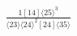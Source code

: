 \documentclass[varwidth, border=5pt]{standalone}
\begin{document}
\begin{my}
$\begin{gathered}
\scriptscriptstyle\frac{1[14]⟨25⟩^3}{⟨23⟩⟨24⟩^2[24]⟨35⟩}
\end{gathered}$
\end{my}
\end{document}
